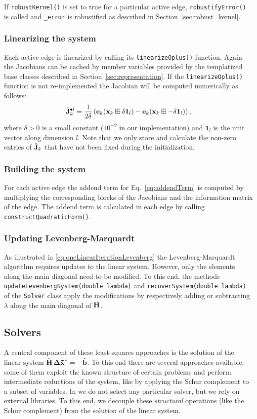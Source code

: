 \documentclass[a4paper]{article}
\begin{document}
 If \verb+robustKernel()+ is set to true for a particular active edge,
\verb+robustifyError()+ is called and \verb+_error+ is robustified
as described in Section~\ref{sec:robust_kernel}.

\subsubsection{Linearizing the system}
Each active edge is linearized by calling its
\verb+linearizeOplus()+ function. Again the Jacobians can be cached by
member variables provided by the templatized base classes described in
Section~\ref{sec:representation}. If the \verb+linearizeOplus()+
function is not re-implemented the Jacobian will be computed
numerically as follows:
\begin{eqnarray}
  \tilde {\mathbf{J}}_k^{\bullet l} = \frac{1}{2\delta} \left(
  \mathbf{e}_k (\mathbf{x}_k \boxplus \delta\mathbf{1}_l)
  -
  \mathbf{e}_k (\mathbf{x}_k \boxplus -\delta\mathbf{1}_l)
  \right),
  \label{eqn:jacobiannumeric}
\end{eqnarray}
where $\delta > 0$ is a small constant ($10^{-9}$ in our
implementation) and $\mathbf{1}_l$ is the unit vector along dimension
$l$. Note that we only store and calculate the non-zero entries of
$\tilde {\mathbf{J}}_k$ that have not been fixed during the initialization.

\subsubsection{Building the system}
For each active edge the addend term for Eq.~\ref{eq:addendTerm} is
computed by multiplying the corresponding blocks of the Jacobians and
the information matrix of the edge. The addend term is calculated in
each edge by calling \verb+constructQuadraticForm()+.

\subsubsection{Updating Levenberg-Marquardt}
As illustrated in \eqref{eq:oneLinearIterationLevenberg} the
Levenberg-Marquardt algorithm requires updates to the linear system.
However, only the elements along the main diagonal need to be modified.
To this end, the methods \verb+updateLevenbergSystem(double lambda)+ and
\verb+recoverSystem(double lambda)+ of the \verb+Solver+ class apply the
modifications by respectively adding or subtracting $\lambda$ along the
main diagonal of $\mathbf{H}$.

\subsection{Solvers}
A central component of these least-squares approaches is the solution
of the linear system $\tilde {\mathbf{H}} \, \mathbf{\Delta \tilde x}^* = - \tilde {\mathbf{b}}$. To
this end there are several approaches available, some of them exploit
the known structure of certain problems and perform intermediate
reductions of the system, like by applying the Schur complement to a
subset of variables.  In \gopt{} we do not select any particular solver,
but we rely on external libraries.  To this end, we decouple these
\emph{structural} operations (like the Schur complement)
from the solution of the linear system.
\end{document}

